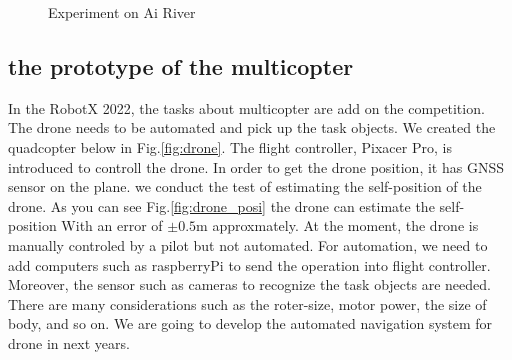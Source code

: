 \documentclass[lettersize,journal]{IEEEtran}
\begin{document}
\begin{figure}[H]
    \begin{center}
    \end{center}
    \caption{Experiment on Ai River}
    \label{fig:mini_v_experiment}
\end{figure}

\subsection{the prototype of the multicopter}
In the RobotX 2022, the tasks about multicopter are add on the competition. The drone needs to be automated and pick up the task objects.
We created the quadcopter below in Fig.\ref{fig:drone}.
The flight controller, Pixacer Pro\cite{pixracer}, is introduced to controll the drone. 
In order to get the drone position, it has GNSS sensor on the plane.
we conduct the test of estimating the self-position of the drone. As you can see Fig.\ref{fig:drone_posi} the drone can estimate
the self-position With an error of $\pm 0.5 \mathrm{m}$ approxmately.
At the moment, the drone is manually controled by a pilot but not automated.
For automation, we need to add computers such as raspberryPi to send the operation into flight controller. 
Moreover, the sensor such as cameras to recognize the task objects are needed.
There are many considerations such as the roter-size, motor power, the size of body, and so on.
We are going to develop the automated navigation system for drone in next years.
\end{document}
